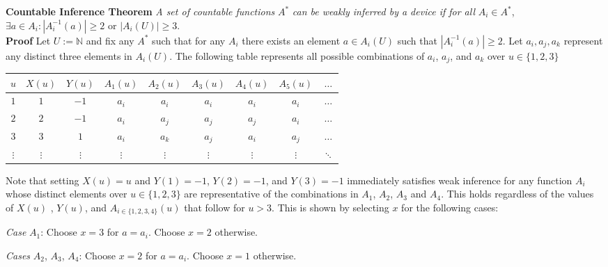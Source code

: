 \documentclass[11pt]{article}
\newcommand{\N}{\mathbb{N}}
\begin{document}
\bigskip
\newpage
\textbf{Countable Inference Theorem} \; \textit{A set of countable functions} $ A^{*} $ \textit{can be weakly inferred by a device if for all} $ A_i \in A^{*} $,  $\exists a \in A_i : |A_i^{-1}(a)| \geq 2 $ or $ |A_i(U)| \geq 3 $. \\
\textbf{Proof} \; Let $ U := \N $ and fix any $ A^{*} $ such that for any $ A_i $  there exists an element $ a \in A_i(U) $ such that $ | A_i^{-1}(a) | \geq 2 $. Let $ a_i, a_j, a_k $ represent any distinct three elements in $ A_i(U) $. The following table represents all possible combinations of $ a_i $, $ a_j$, and $ a_k $ over $ u \in \{1, 2, 3\} $ \\
 \begin{center}
 \begin{tabular}{ |c||c|c|c|c|c|c|c|c } 

 \hline
 $ u $ & $ X(u) $ & $Y(u)$ & $ A_1(u) $ & $ A_2(u) $ & $ A_3(u) $ & $ A_4(u) $ & $ A_5(u) $ & $ \dots $ \\ 
 \hline
 \hline
 $ 1 $ & $ 1 $ & $ -1 $ & $ a_i $ & $ a_i $ & $ a_i $ & $ a_i $ & $ a_i $ & $ \dots $ \\
 \hline
 $ 2 $ & $ 2 $ & $ -1 $ & $ a_i $ & $ a_j $ & $ a_j $ & $ a_j $ & $ a_i $ & $ \dots $ \\
 \hline
 $ 3 $ & $ 3 $ & $ 1 $ & $ a_i $ & $ a_k $ & $ a_j $ & $ a_i $ & $ a_j $ & $ \dots $ \\
 \hline
 $ \vdots $ & $ \vdots $ & $ \vdots $ & $ \vdots $ & $ \vdots $ & $ \vdots $ & $ \vdots $ & $ \vdots $ & $ \ddots $ \\
 \end{tabular} 
 \end{center}
\bigskip 
Note that setting $ X(u) = u $ and $ Y(1) = -1 $, $ Y(2) = -1 $, and $ Y(3) = -1 $ immediately satisfies weak inference for any function $ A_i $ whose distinct elements over $ u \in \{1, 2, 3\} $ are representative of the combinations in $ A_1 $, $ A_2 $, $ A_3 $ and $ A_4 $. This holds regardless of the values of $ X(u) $ , $ Y(u) $, and $ A_{ i \in \{1, 2, 3, 4\} }(u) $ that follow for $ u > 3 $. This is shown by selecting $ x $ for the following cases:

\bigskip
\textit{Case} $ A_1 $: Choose $ x = 3 $ for $ a = a_i $. Choose $ x = 2 $ otherwise. 

\textit{Cases} $ A_2 $, $ A_3 $, $ A_4 $: Choose $ x = 2 $ for $ a = a_i $. Choose $ x = 1 $ otherwise. \\
\end{document}

